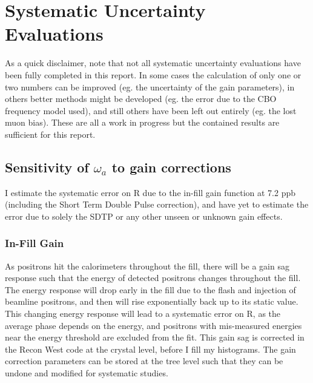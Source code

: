 \graphicspath{ {Figures/Pileup/Multiplier/} {Figures/Pileup/Phase/} {Figures/Pileup/EnergyScaling/} {Figures/RandomSeeds/FitStartScans/} {Figures/RandomSeeds/FitIterations/} {Figures/Miscellaneous/} {Figures/FitStartScans/} {Figures/CBO/Frequency/} {Figures/CBO/Shape/} {Figures/CBO/LifetimeScan/} {Figures/Gain/InFill/} {Figures/Gain/InFillCrystals/} {Figures/VW/} {Figures/LostMuons/} {Figures/BunchNumber/} }

\chapter{Systematic Uncertainty Evaluations}
\label{Ch:Systematics}

	As a quick disclaimer, note that not all systematic uncertainty evaluations have been fully completed in this report. In some cases the calculation of only one or two numbers can be improved (eg. the uncertainty of the gain parameters), in others better methods might be developed (eg. the error due to the CBO frequency model used), and still others have been left out entirely (eg. the lost muon bias). These are all a work in progress but the contained results are sufficient for this report.
	

\section{Sensitivity of \texorpdfstring{$\omega_{a}$}{} to gain corrections}
\label{Sec:SystematicGain}

	I estimate the systematic error on R due to the in-fill gain function at 7.2 ppb (including the Short Term Double Pulse correction), and have yet to estimate the error due to solely the SDTP or any other unseen or unknown gain effects. %

	\subsection{In-Fill Gain}

		As positrons hit the calorimeters throughout the fill, there will be a gain sag response such that the energy of detected positrons changes throughout the fill. The energy response will drop early in the fill due to the flash and injection of beamline positrons, and then will rise exponentially back up to its static value. This changing energy response will lead to a systematic error on R, as the average \gmtwo phase depends on the energy, and positrons with mis-measured energies near the energy threshold are excluded from the fit. This gain sag is corrected in the Recon West code at the crystal level, before I fill my histograms. The gain correction parameters can be stored at the tree level such that they can be undone and modified for systematic studies.

